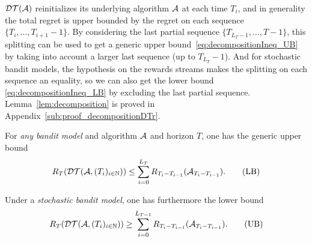 \documentclass[12pt]{colt2018} %
\begin{document}
$\mathcal{DT}(\mathcal{A})$ reinitializes its underlying algorithm $\mathcal{A}$ at each time $T_i$,
and in generality the total regret is upper bounded by the regret on
each sequence $\{T_i,\dots, T_{i+1} - 1\}$.
By considering the last partial sequence $\{T_{L_T-1}, \dots, T - 1\}$, this splitting can be used to get
a generic upper bound~\eqref{eq:decompositionIneq_UB} by taking into account a larger last sequence (up to $T_{L_T} - 1$).
And for stochastic bandit models, the \iid{} hypothesis on the rewards streams makes the splitting on each sequence an equality, so we can also get the lower bound \eqref{eq:decompositionIneq_LB} by excluding the last partial sequence.
Lemma~\ref{lem:decomposition} is
proved in Appendix~\ref{sub:proof_decompositionDTr}.




\begin{lemma}\label{lem:decomposition}

    For \emph{any bandit model} and algorithm $\mathcal{A}$ and horizon $T$, one has the generic upper bound
    \vspace*{-5pt}  %
    \begin{align}
        R_T(\mathcal{DT}(\mathcal{A}, (T_i)_{i\in\mathbb{N}}))
        \leq \sum_{i=0}^{L_T} R_{T_i - T_{i-1}}(\mathcal{A}_{T_i - T_{i-1}}). \tag{LB}\label{eq:decompositionIneq_LB}
    \end{align}

    Under a \emph{stochastic bandit model}, one has furthermore the lower bound
    \begin{align}
        R_T(\mathcal{DT}(\mathcal{A}, (T_i)_{i\in\mathbb{N}}))
        \geq \sum_{i=0}^{L_{T-1}} R_{T_i - T_{i-1}}(\mathcal{A}_{T_i - T_{i-1}}). \tag{UB}\label{eq:decompositionIneq_UB}
    \end{align}
\end{lemma}
\end{document}
